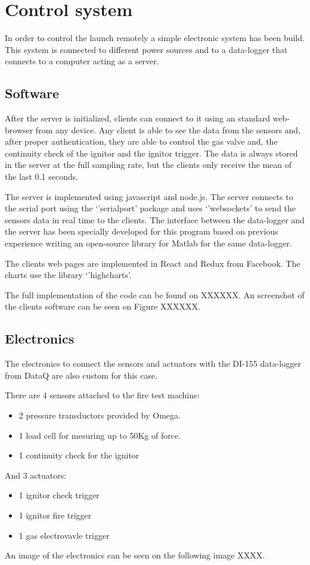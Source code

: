 
\section*{Control system}

In order to control the launch remotely a simple electronic system has been build. This system is connected to different power sources and to a data-logger that connects to a computer acting as a server.

\subsection*{Software}

After the server is initialized, clients can connect to it using an standard web-browser from any device. Any client is able to see the data from the sensors and, after proper authentication, they are able to control the gas valve and, the continuity check of the ignitor and the ignitor trigger. The data is always stored in the server at the full sampling rate, but the clients only receive the mean of the last 0.1 seconds.

The server is implemented using javascript and node.js. The server connects to the serial port using the `'serialport' package and uses `'websockets' to send the sensors data in real time to the clients. The interface between the data-logger and the server has been specially developed for this program based on previous experience writing an open-source library for Matlab for the same data-logger.

The clients web pages are implemented in React and Redux from Facebook. The charts use the library `'highcharts'.

The full implementation of the code can be found on XXXXXX. An screenshot of the clients software can be seen on Figure XXXXXX.

\subsection*{Electronics}

The electronics to connect the sensors and actuators with the DI-155 data-logger from DataQ are also custom for this case.

There are 4 sensors attached to the fire test machine:
\begin{itemize}
  \item 2 pressure transductors provided by Omega.
  \item 1 load cell for mesuring up to 50Kg of force.
  \item 1 continuity check for the ignitor
\end{itemize}

And 3 actuators:
\begin{itemize}
  \item 1 ignitor check trigger
  \item 1 ignitor fire trigger
  \item 1 gas electrovavle trigger
\end{itemize}

An image of the electronics can be seen on the following image XXXX.
